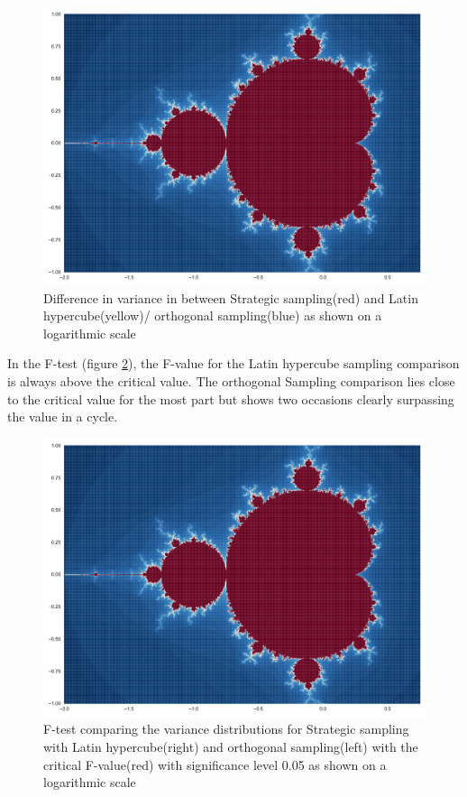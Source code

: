 \documentclass{uva-inf-article}
\begin{document}
\begin{figure}[h!]
  \centering
 \includegraphics[width=.85\textwidth]{fractal.pdf}
  \caption{Difference in variance in between Strategic sampling(red) and Latin hypercube(yellow)/ orthogonal sampling(blue) as shown on a logarithmic scale}
  \label{fig:log_var}
\end{figure}

In the F-test (figure \ref{fig:f_test}), the F-value for the Latin hypercube sampling comparison is always above the critical value.
The orthogonal Sampling comparison lies close to the critical value for the most part but shows two occasions clearly surpassing the value in a cycle.\\

\begin{figure}[h!]
  \centering
  \includegraphics[width=.85\textwidth]{fractal.pdf}
  \caption{F-test comparing the variance distributions for Strategic sampling with Latin hypercube(right) and orthogonal sampling(left) with the critical F-value(red) with significance level 0.05 as shown on a logarithmic scale}
  \label{fig:f_test}
\end{figure}
\end{document}
